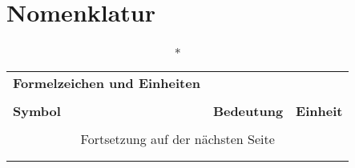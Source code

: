 \chapter*{Nomenklatur}
\begin{onehalfspacing}
\begin{longtable}[h]{p{} p{} p{}}
		\caption*{\textbf{Formelzeichen und Einheiten}} \\
		\\
		\textbf{Symbol} & \textbf{Bedeutung} & \textbf{Einheit} \\ %
		\endhead
		\\
		\multicolumn{3}{c}{Fortsetzung auf der nächsten Seite} \\
		\endfoot
		\multicolumn{3}{c}{ } \\
		\endlastfoot
		

\end{longtable}
\end{onehalfspacing}
